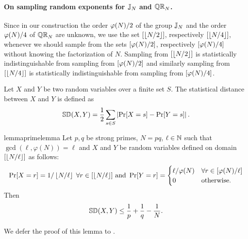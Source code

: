 \paragraph{On sampling random exponents for $\mathbb{J}_N$ and $\mathbb{QR}_N$.}
Since in our construction the order $\varphi(N)/2$ of the group $\mathbb{J}_N$ and the order $\varphi(N)/4$ of $\mathbb{QR}_N$ are unknown, we use the set $[\left\lfloor N/2 \right\rfloor]$, respectively $[\left\lfloor N/4 \right\rfloor]$, whenever we should sample from the sets $[\varphi(N)/2]$, respectively $[\varphi(N)/4]$ without knowing the factorization of $N$. Sampling from $[\left\lfloor N/2 \right\rfloor]$ is statistically indistinguishable from sampling from $[\varphi(N)/2]$ and similarly sampling from $[\left\lfloor N/4 \right\rfloor]$ is statistically indistinguishable from sampling from $[\varphi(N)/4]$. 


\begin{definition}
Let $X$ and $Y$ be two random variables over a finite set $S$. The statistical distance between $X$ and $Y$ is defined as 
\[\mathbb{SD}(X, Y) = \frac{1}{2} \sum_{s \in S} \left| \Pr[X = s] - \Pr[Y = s] \right|.\]
\end{definition}


\begin{restatable}{lemma}{primelemma}\label{sampling-lemma}
Let $p,q$ be strong primes, $N=pq$, $\ell \in \mathbb{N}$ such that $\gcd(\ell, \varphi(N)) = \ell$ and  $X$ and $Y$ be random variables defined on domain $[\left\lfloor N/\ell \right\rfloor]$ as follows:
\[
\Pr[X = r] = 1/\left\lfloor N/\ell \right\rfloor \; \forall r \in [\left\lfloor N/\ell \right\rfloor] \text{ and } \Pr[Y = r] = 
\begin{cases} 
     \ell/\varphi(N) & \forall r \in [\varphi(N)/\ell] \\
     0 & \text{otherwise}. 
   \end{cases}
\]
Then 
\[
\mathbb{SD}(X, Y) \leq \frac{1}{p}+\frac{1}{q}-\frac{1}{N}.
\]
\end{restatable}

We defer the proof of this lemma to .



